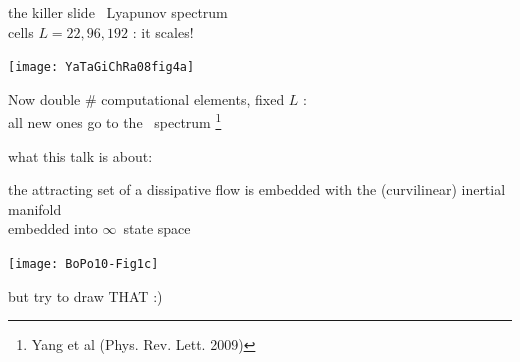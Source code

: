 \begin{frame}{the killer slide}
\KS\ Lyapunov spectrum \\ cells $L=22, 96, 192$ : it scales!
\begin{center}
\texttt{[image: YaTaGiChRa08fig4a]}
\end{center}

Now double \# computational elements, fixed $L$ : \\
all new ones go to the \transient\ spectrum
\footnote{\footnotesize
Yang et al (Phys. Rev. Lett. 2009)}
\end{frame}

\begin{frame}{what this talk is about:}
\begin{block}{
the attracting set of a dissipative flow}
is embedded with the (curvilinear) inertial manifold \\
embedded into $\infty$\dmn\ state space
\begin{center}
\texttt{[image: BoPo10-Fig1c]}
\end{center}
\end{block}
but try to draw THAT :)
\end{frame}


